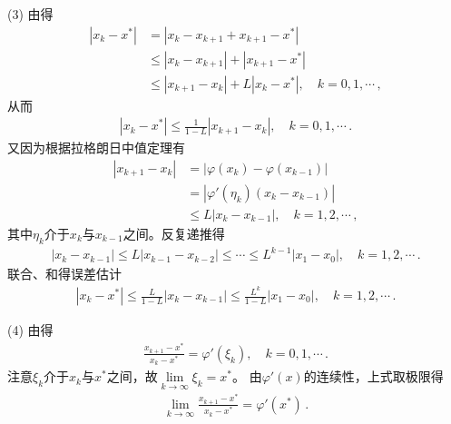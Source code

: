 \begin{prove}
    (3) 由得
    \begin{align}\label{eq:02ex0316}
        |x_k-x^*| & =|x_k-x_{k+1}+x_{k+1}-x^*|\nonumber                \\
                  & \le|x_k-x_{k+1}|+|x_{k+1}-x^*|\nonumber            \\
                  & \le|x_{k+1}-x_k|+L|x_k-x^*|,\quad k=0,1,\cdots\, ,
    \end{align}
    从而
    \begin{align}\label{eq:02ex0317}
        |x_k-x^*|\le\frac{1}{1-L}|x_{k+1}-x_k|,\quad k=0,1,\cdots\, .
    \end{align}
    又因为根据拉格朗日中值定理有
    \begin{align}\label{eq:02ex0318}
        |x_{k+1}-x_k| & =|\varphi(x_k)-\varphi(x_{k-1})|\nonumber \\
                      & =|\varphi'(\eta_k)(x_k-x_{k-1})|\nonumber \\
                      & \le L|x_k-x_{k-1}|,\quad k=1,2,\cdots\, ,
    \end{align}
    其中$\eta_k$介于$x_k$与$x_{k-1}$之间。反复递推得
    \begin{align}\label{eq:02ex0319}
        |x_k-x_{k-1}|\le L |x_{k-1}-x_{k-2}|\le\cdots\le L^{k-1}|x_1-x_0|,\quad k=1,2,\cdots\, .
    \end{align}
    联合、和得误差估计
    \begin{align}\label{eq:02ex0320}
        |x_k-x^*|\le\frac{L}{1-L}|x_k-x_{k-1}|\le\frac{L^k}{1-L}|x_1-x_0|,\quad k=1,2,\cdots\, .
    \end{align}

    (4) 由得
    \begin{align}\label{eq:02ex0321}
        \frac{x_{k+1}-x^*}{x_k-x^*}=\varphi'(\xi_k),\quad k=0,1,\cdots\, .
    \end{align}
    注意$\xi_k$介于$x_k$与$x^*$之间，故$\displaystyle\lim\limits_{k\rightarrow\infty}{\xi_k}=x^*$。
    由$\varphi'(x)$的连续性，上式取极限得
    \begin{align}\label{eq:02ex0322}
        \lim\limits_{k\rightarrow\infty}{\frac{x_{k+1}-x^*}{x_k-x^*}}=\varphi'(x^*)\, .
    \end{align}
\end{prove}

